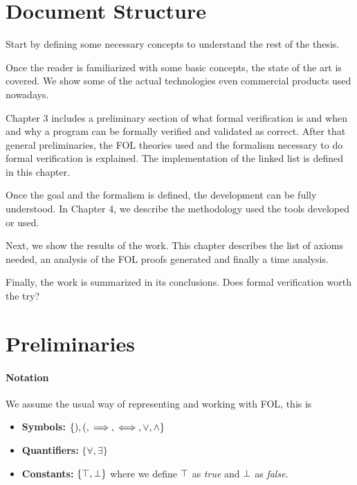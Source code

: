 \section{Document Structure}

Start by defining some necessary concepts to understand the rest of the thesis.

Once the reader is familiarized with some basic concepts, the state of the art is covered. 
%
We show some of the actual technologies even commercial products used nowadays. 



Chapter 3 includes a preliminary section of what formal verification is and when and why a program can be formally verified and validated as correct. 
% 
After that general preliminaries, the \gls{FOL} theories used and the formalism necessary to do formal verification is explained.
%
The implementation of the linked list is defined in this chapter.

Once the goal and the formalism is defined, the development can be fully understood. 
%
In Chapter 4, we describe the methodology used the tools developed or used.

Next, we show the results of the work. 
%
This chapter describes the list of axioms needed, an analysis of the \gls{FOL} proofs generated and finally a time analysis.

Finally, the work is summarized in its conclusions. 
%
Does formal verification worth the try? 


\section{Preliminaries}


\paragraph{Notation}
\label{def:notation}
We assume the usual way of representing and working with \gls{FOL}, this is
\begin{itemize}
	\item \textbf{Symbols:} $\{),(, \implies, \iff, \vee , \wedge \}$
	\item \textbf{Quantifiers:} $\{\forall, \exists\}$
	\item \textbf{Constants:} $\{\top,\perp\}$
	where we define $\top$ as \textit{true} and $\perp$ as \textit{false}.
\end{itemize}

